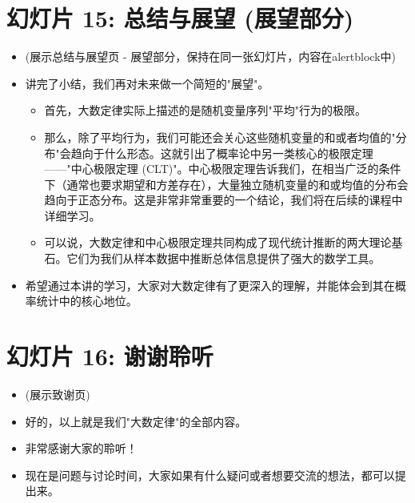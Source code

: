 \documentclass[UTF8]{article} %
\begin{document}
\section*{幻灯片 15: 总结与展望 (展望部分)}
\begin{itemize}
    \itemsep1em
    \item (展示总结与展望页 - 展望部分，保持在同一张幻灯片，内容在alertblock中)
    \item 讲完了小结，我们再对未来做一个简短的"展望"。
    \begin{itemize}[label=\textbullet, itemsep=0.5em]
        \item 首先，大数定律实际上描述的是随机变量序列"平均"行为的极限。
        \item 那么，除了平均行为，我们可能还会关心这些随机变量的和或者均值的"分布"会趋向于什么形态。这就引出了概率论中另一类核心的极限定理——"中心极限定理 (CLT)"。中心极限定理告诉我们，在相当广泛的条件下（通常也要求期望和方差存在），大量独立随机变量的和或均值的分布会趋向于正态分布。这是非常非常重要的一个结论，我们将在后续的课程中详细学习。
        \item 可以说，大数定律和中心极限定理共同构成了现代统计推断的两大理论基石。它们为我们从样本数据中推断总体信息提供了强大的数学工具。
    \end{itemize}
    \item 希望通过本讲的学习，大家对大数定律有了更深入的理解，并能体会到其在概率统计中的核心地位。
\end{itemize}

\section*{幻灯片 16: 谢谢聆听}
\begin{itemize}
    \itemsep1em
    \item (展示致谢页)
    \item 好的，以上就是我们"大数定律"的全部内容。
    \item 非常感谢大家的聆听！
    \item 现在是问题与讨论时间，大家如果有什么疑问或者想要交流的想法，都可以提出来。
\end{itemize}
\end{document}
